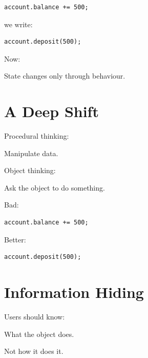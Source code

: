 \documentclass[11pt,a4paper]{book}
\begin{document}
\begin{verbatim}
account.balance += 500;
\end{verbatim}

we write:

\begin{verbatim}
account.deposit(500);
\end{verbatim}

Now:

\begin{center}
State changes only through behaviour.
\end{center}


\section{A Deep Shift}

Procedural thinking:

\begin{center}
Manipulate data.
\end{center}

Object thinking:

\begin{center}
Ask the object to do something.
\end{center}


Bad:

\begin{verbatim}
account.balance += 500;
\end{verbatim}

Better:

\begin{verbatim}
account.deposit(500);
\end{verbatim}


\section{Information Hiding}

\begin{idea}

Users should know:

What the object does.

Not how it does it.

\end{idea}
\end{document}
